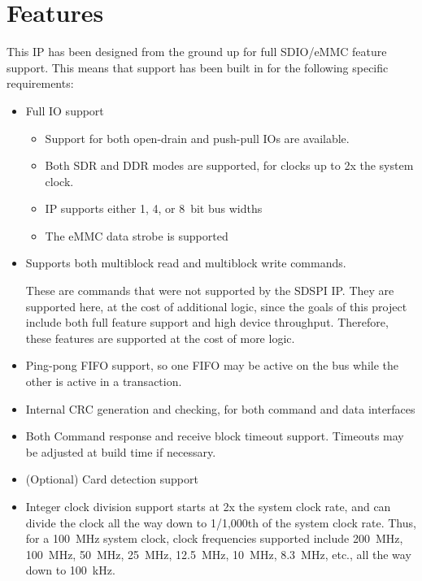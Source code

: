 \documentclass{gqtekspec}
\begin{document}
\chapter{Features}\label{ch:features}
This IP has been designed from the ground up for full SDIO/eMMC feature
support.  This means that support has been built in for the following
specific requirements:

\begin{itemize}
\item Full IO support
	\begin{itemize}
	\item Support for both open-drain and push-pull IOs are available.
	\item Both SDR and DDR modes are supported, for clocks up
		to 2x the system clock.
	\item IP supports either 1, 4, or 8~bit bus widths
	\item The eMMC data strobe is supported
	\end{itemize}	

\item Supports both multiblock read and multiblock write commands.

	These are commands that were not supported by the SDSPI IP.  They
	are supported here, at the cost of additional logic, since the
	goals of this project include both full feature support and high
	device throughput.  Therefore, these features are supported at the
	cost of more logic.

\item Ping-pong FIFO support, so one FIFO may be active on the bus while the
	other is active in a transaction.

\item Internal CRC generation and checking, for both command and data
	interfaces

\item Both Command response and receive block timeout support.  Timeouts may
	be adjusted at build time if necessary.

\item (Optional) Card detection support

\item Integer clock division support starts at 2x the system clock rate,
	and can divide the clock all the way down to 1/1,000th of the system
	clock rate.  Thus, for a 100~MHz system clock, clock frequencies
	supported include 200~MHz, 100~MHz, 50~MHz, 25~MHz, 12.5~MHz, 10~MHz,
	8.3~MHz, etc.,  all the way down to 100~kHz.


\end{itemize}
\end{document}
